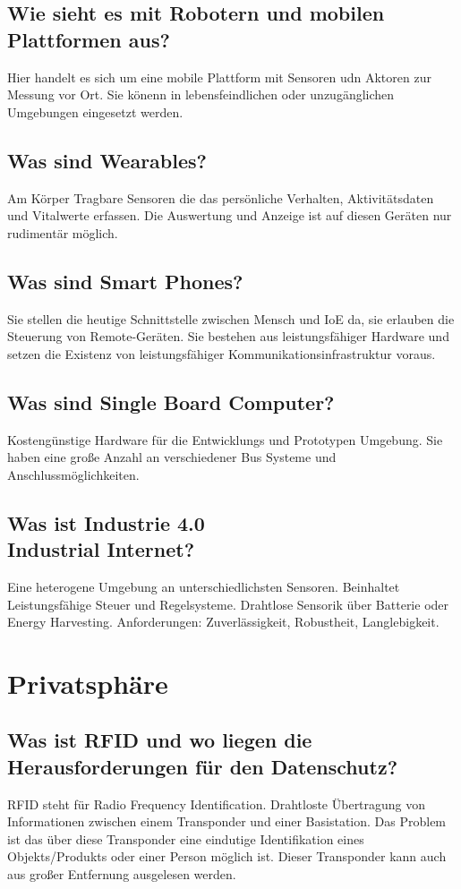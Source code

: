 	\subsection{Wie sieht es mit Robotern und mobilen Plattformen aus?}
	Hier handelt es sich um eine mobile Plattform mit Sensoren udn Aktoren zur Messung vor Ort.
	Sie könenn in lebensfeindlichen oder unzugänglichen Umgebungen eingesetzt werden.
	\subsection{Was sind Wearables?}
	Am Körper Tragbare Sensoren die das persönliche Verhalten, Aktivitätsdaten und Vitalwerte erfassen.
	Die Auswertung und Anzeige ist auf diesen Geräten nur rudimentär möglich.
	\subsection{Was sind Smart Phones?}
	Sie stellen die heutige Schnittstelle zwischen Mensch und IoE da, sie erlauben die Steuerung von Remote-Geräten.
	Sie bestehen aus leistungsfähiger Hardware und setzen die Existenz von leistungsfähiger Kommunikationsinfrastruktur voraus.
	\subsection{Was sind Single\- Board Computer?}
	Kostengünstige Hardware für die Entwicklungs und Prototypen Umgebung.
	Sie haben eine große Anzahl an verschiedener Bus Systeme und Anschlussmöglichkeiten.
	
	\subsection{Was ist Industrie 4.0 \\ Industrial Internet?}
	Eine heterogene Umgebung an unterschiedlichsten Sensoren. Beinhaltet Leistungsfähige Steuer\- und Regelsysteme.
	Drahtlose Sensorik über Batterie oder Energy Harvesting.
	Anforderungen: Zuverlässigkeit, Robustheit, Langlebigkeit.
	
\section{Privatsphäre}
	\subsection{Was ist RFID und wo liegen die Herausforderungen für den Datenschutz?}
	RFID steht für Radio Frequency Identification. Drahtloste Übertragung von Informationen zwischen einem Transponder und einer Basistation.
	Das Problem ist das über diese Transponder eine eindutige Identifikation eines Objekts/Produkts oder einer Person möglich ist. Dieser Transponder kann auch aus großer Entfernung ausgelesen werden.
